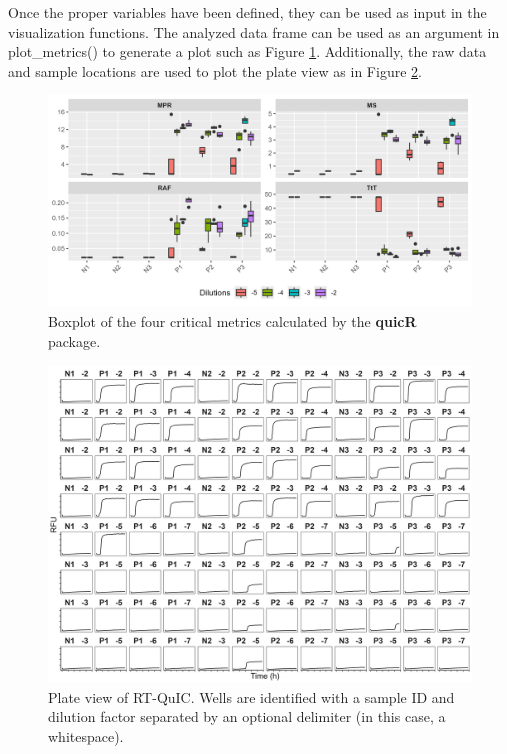 \documentclass[preprint,12pt,a4paper]{elsarticle}
\begin{document}
            Once the proper variables have been defined, they can be used as input in the visualization functions. The analyzed data frame can be used as an argument in plot\_metrics() to generate a plot such as Figure \ref{fig:boxplot}. Additionally, the raw data and sample locations are used to plot the plate view as in Figure \ref{fig:plateview}.

            \begin{figure}[ht]
                \centering
                \includegraphics[width=\textwidth]{images/boxplot.png}
                \caption{Boxplot of the four critical metrics calculated by the \textbf{quicR} package.}
                \label{fig:boxplot}
            \end{figure}

            \begin{figure}[ht]
                \centering
                \includegraphics[width=\textwidth]{images/plate_view.png}
                \caption{Plate view of RT-QuIC. Wells are identified with a sample ID and dilution factor separated by an optional delimiter (in this case, a whitespace).}
                \label{fig:plateview}
            \end{figure}
            
\end{document}
